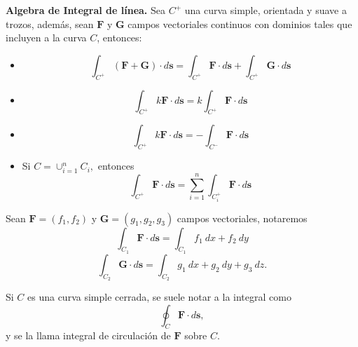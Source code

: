  \begin{propertie} \textbf{Algebra de Integral de l\'inea.}\label{alge} Sea $C^{+}$ una curva simple, orientada y suave a trozos, adem\'as,  sean  $\mathbf{F}$ y $\mathbf{G}$ campos vectoriales continuos con dominios tales que incluyen a la curva $C$, entonces: 
\begin{itemize}
\item[1.]  \[
        \int_{C^{+}}(\mathbf{F} + \mathbf{G})  \cdot d\mathbf{s}=  \int_{C^{+}} \mathbf{F} \cdot d\mathbf{s}  +  \int_{C^{+}} \mathbf{G}  \cdot d\mathbf{s} 
    \]

\item[2.]  \[
        \int_{C^{+}} k \mathbf{F}  \cdot d\mathbf{s}= k \int_{C^{+}} \mathbf{F} \cdot d\mathbf{s}   
    \]

\item[3.]  \[
        \int_{C^{+}} k \mathbf{F}  \cdot d\mathbf{s}= - \int_{C^{-}} \mathbf{F} \cdot d\mathbf{s}   
    \]

\item[3.]  Si $C = \cup_{i=1}^{n} C_{i},$ entonces \[
        \int_{C^{+}}  \mathbf{F}  \cdot d\mathbf{s}=  \sum_{i=1}^{n}  \int_{C_{i}^{+}} \mathbf{F} \cdot d\mathbf{s}   
    \]

\end{itemize}
 \end{propertie}


 \begin{nota}\label{not_int} Sean  $\mathbf{F}=(f_1, f_2)$ y $\mathbf{G}=(g_1, g_2, g_3)$ campos vectoriales, notaremos $$ \int_{C_1}\mathbf{F}\cdot d\mathbf{s} =  \int_{ C_1}f_1\:dx+ f_2 \:dy$$ 
  $$ \int_{C_2}\mathbf{G}\cdot d\mathbf{s} =  \int_{C_2} g_1\:dx+g_2\:dy+g_3\:dz.$$
 \end{nota}
 

\begin{nota} Si $C$  es una curva simple cerrada,  se suele notar a la integral como
    \[
        \oint_{C}\mathbf{F}\cdot d\mathbf{s},  
    \]  y se la llama integral de circulaci\'on de $\mathbf{F}$ sobre $C$.
\end{nota}




